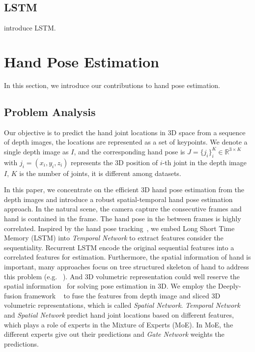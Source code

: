 \documentclass[journal,comsoc]{IEEEtran}
\begin{document}
\subsection{LSTM}
introduce LSTM.

\section{Hand Pose Estimation}\label{sec:hand pose estimation}
In this section, we introduce our contributions to hand pose estimation.

\subsection{Problem Analysis}\label{sec:problem analysis}
Our objective is to predict the hand joint locations in 3D space from a sequence of depth images,
the locations are represented as a set of keypoints. We denote a single depth image as $\mathit{I}$, and
the corresponding hand pose is
$\mathit{J}=\{\mathit{j}_i\}_i^K \in \mathbb{R}^{3 \times K}$ with $\mathit{j}_i=(x_i,y_i,z_i)$
represents the 3D position of $i$-th joint in the depth image $\mathit{I}$, $K$ is the number of joints,
it is different among datasets.

In this paper, we concentrate on the efficient 3D hand pose estimation from the depth images and
introduce a robust spatial-temporal hand pose estimation approach. In the natural scene, the camera
capture the consecutive frames and hand is contained in the frame.
The hand pose in the between frames is highly correlated. Inspired by the hand pose
tracking~\cite{quach2016depth}, we embed Long Short Time Memory (LSTM) into \emph{Temporal Network}
to extract features consider the sequentiality. Recurrent LSTM encode the original sequential
features into a correlated features for estimation. Furthermore, the spatial information of hand is
important, many approaches focus on tree structured skeleton of hand to address this problem (e.g.
~\cite{li20153d, wan2016direction, ye2016spatial}). And 3D volumetric representation could well reserve
the spatial information~\cite{deng2017hand3d} for solving pose estimation in 3D. We employ the
Deeply-fusion framework ~\cite{wang2016deeply} to fuse the features from depth image and sliced 3D
volumetric representations, which is called \emph{Spatial Network}. \emph{Temporal Network} and
\emph{Spatial Network} predict hand joint locations based on different features, which plays a
role of experts in the Mixture of Experts (MoE). In MoE, the different experts give out their
predictions and \emph{Gate Network} weights the predictions.
\end{document}
